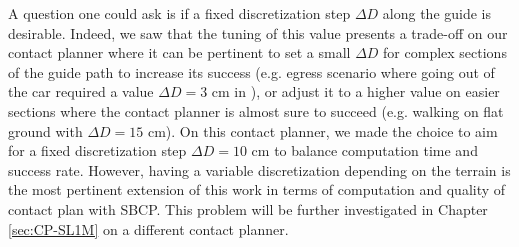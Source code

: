 A question one could ask is if a fixed discretization step $\Delta D$ along the guide is desirable. 
Indeed, we saw that the tuning of this value presents a trade-off on our contact planner where it can be pertinent to set a small $\Delta D$ for complex sections of the guide path to increase its success (e.g. egress scenario where going out of the car required a value $\Delta D=3$ cm in \cite{AcyclicCP}), or adjust it to a higher value on easier sections where the contact planner is almost sure to succeed (e.g. walking on flat ground with $\Delta D=15$ cm).
On this contact planner, we made the choice to aim for a fixed discretization step $\Delta D=10$ cm to balance computation time and success rate.
However, having a variable discretization depending on the terrain is the most pertinent extension of this work in terms of computation and quality of contact plan with SBCP.
This problem will be further investigated in Chapter \ref{sec:CP-SL1M} on a different contact planner.


